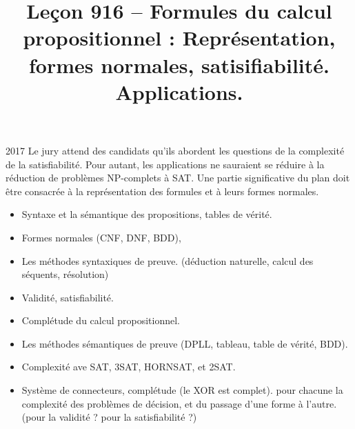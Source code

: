 \documentclass{agregfiche}
\title{Leçon 916 -- Formules du calcul propositionnel : Représentation, formes
normales, satisifiabilité. Applications.}
\begin{document}
\maketitle

\secrapports

\begin{rapport}{2017}
    Le jury attend des candidats qu'ils abordent les questions de la complexité de la satisfiabilité. Pour autant, les applications ne sauraient se réduire à la réduction de problèmes NP-complets à SAT. Une partie significative du plan doit être consacrée à la représentation des formules et à leurs formes normales.
\end{rapport}

\secindispensables

\begin{itemize}
    \item Syntaxe et la sémantique des propositions, tables de vérité.
    \item Formes normales (CNF, DNF, BDD),
    \item Les méthodes syntaxiques de preuve. (déduction naturelle,
      calcul des séquents, résolution)
    \item Validité, satisfiabilité.

\end{itemize}

\secasavoir

\begin{itemize}
    \item Complétude du calcul propositionnel.
    \item Les méthodes sémantiques de preuve (DPLL, tableau,
table de vérité, BDD).
	\item Complexité ave SAT, 3SAT, HORNSAT, et 2SAT.
	\item Système de connecteurs, complétude (le XOR est complet).
	pour chacune la complexité des problèmes de décision,
	et du passage d'une forme à l'autre. (pour la validité ? pour la
	satisfiabilité ?)
\end{itemize}


\secidees
\end{document}
